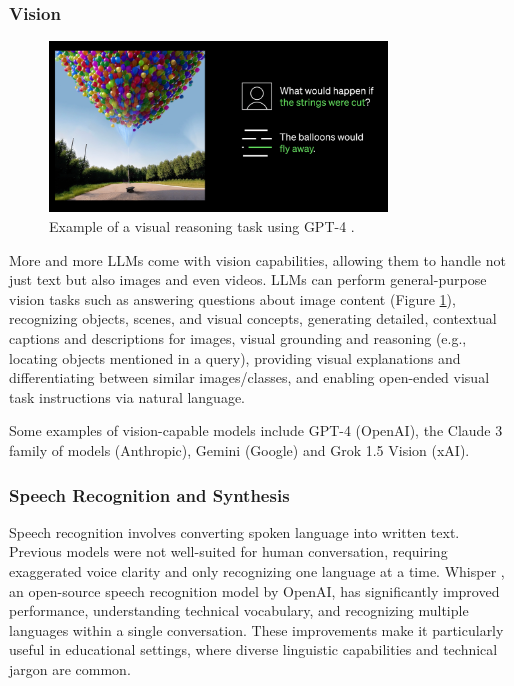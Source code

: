 \documentclass{article}
\begin{document}
\subsubsection{Vision}


\begin{figure}[h]
    \centering
    \includegraphics[width=0.8\textwidth]{images/gpt4-image-description.png}
    \caption{Example of a visual reasoning task using GPT-4 \cite{globalnews_gpt4}.}
    \label{fig:vision_task_example}
\end{figure}

More and more LLMs come with vision capabilities, allowing them to handle not just text but also images and even videos.
LLMs can perform general-purpose vision tasks such as answering questions about image content %
(Figure \ref{fig:vision_task_example}),
recognizing objects, scenes, and visual concepts, generating detailed, contextual captions
and descriptions for images, visual grounding and reasoning (e.g., locating objects mentioned in a query),
providing visual explanations and differentiating between
similar images/classes, and enabling open-ended visual
task instructions via natural language.

Some examples of vision-capable models include GPT-4 (OpenAI), the Claude 3 family of models (Anthropic), Gemini (Google) and Grok 1.5 Vision (xAI).

\subsubsection{Speech Recognition and Synthesis}
Speech recognition involves converting spoken language into written text.
Previous models were not well-suited for human conversation,
requiring exaggerated voice clarity and only recognizing one
language at a time. Whisper \cite{openai2024whisper},
an open-source speech recognition model by OpenAI,
has significantly improved performance, understanding
technical vocabulary, and recognizing multiple languages
within a single conversation. These improvements make it
particularly useful in educational settings, where diverse linguistic
capabilities and technical jargon are common.
\end{document}
